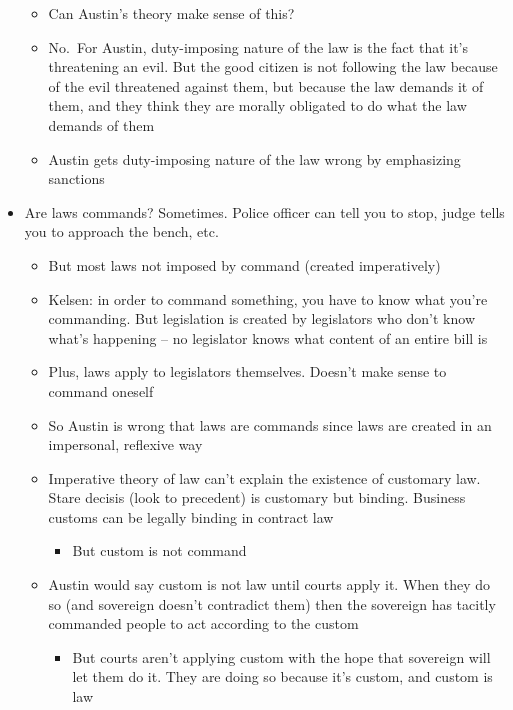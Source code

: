 \begin{itemize}
  \begin{itemize}
  \tightlist
  \item
    Can Austin's theory make sense of this?
  \item
    No.~For Austin, duty-imposing nature of the law is the fact that
    it's threatening an evil. But the good citizen is not following the
    law because of the evil threatened against them, but because the law
    demands it of them, and they think they are morally obligated to do
    what the law demands of them
  \item
    Austin gets duty-imposing nature of the law wrong by emphasizing
    sanctions
  \end{itemize}
\item
  Are laws commands? Sometimes. Police officer can tell you to stop,
  judge tells you to approach the bench, etc.

  \begin{itemize}
  \tightlist
  \item
    But most laws not imposed by command (created imperatively)
  \item
    Kelsen: in order to command something, you have to know what you're
    commanding. But legislation is created by legislators who don't know
    what's happening -- no legislator knows what content of an entire
    bill is
  \item
    Plus, laws apply to legislators themselves. Doesn't make sense to
    command oneself
  \item
    So Austin is wrong that laws are commands since laws are created in
    an impersonal, reflexive way
  \item
    Imperative theory of law can't explain the existence of customary
    law. Stare decisis (look to precedent) is customary but binding.
    Business customs can be legally binding in contract law

    \begin{itemize}
    \tightlist
    \item
      But custom is not command
    \end{itemize}
  \item
    Austin would say custom is not law until courts apply it. When they
    do so (and sovereign doesn't contradict them) then the sovereign has
    tacitly commanded people to act according to the custom

    \begin{itemize}
    \tightlist
    \item
      But courts aren't applying custom with the hope that sovereign
      will let them do it. They are doing so because it's custom, and
      custom is law
    \end{itemize}
  \end{itemize}
\end{itemize}

